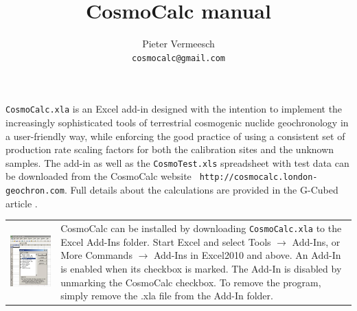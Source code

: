 \documentclass[12pt]{article}
\author{Pieter Vermeesch\\ {\tt cosmocalc@gmail.com}}
\title{CosmoCalc manual}
\date{}
\begin{document}
\maketitle

\begin{minipage}[tbp]{\textwidth}
{\tt CosmoCalc.xla}  is an Excel add-in designed  with the intention
  to  implement the  increasingly sophisticated  tools  of terrestrial
  cosmogenic  nuclide  geochronology  in  a user-friendly  way,  while
  enforcing the good practice of  using a consistent set of production
  rate scaling factors for both  the calibration sites and the unknown
  samples.  The add-in as  well as the {\tt CosmoTest.xls} spreadsheet
  with test  data can  be downloaded from  the CosmoCalc  website {\tt
    http://cosmocalc.london-geochron.com}.    Full   details   about   the
  calculations    are     provided    in    the     G-Cubed    article
  \cite{vermeesch2007}.\\

\begin{tabular}{lp{8cm}}
  \includegraphics[width=.4\textwidth]{checkedAddIn.jpg}
& \vspace{-3.8cm}
  CosmoCalc can be installed by downloading  \texttt{CosmoCalc.xla}  
  to  the  Excel Add-Ins  folder.  Start  Excel and  select
  Tools $\rightarrow$ Add-Ins, or More Commands $\rightarrow$ Add-Ins
in Excel2010 and above. An Add-In is enabled when its checkbox
  is  marked.  The  Add-In  is  disabled by  unmarking  the  CosmoCalc
  checkbox. To remove the program, simply remove the .xla file from the
  Add-In folder.}
\end{tabular}
\end{minipage}
\end{document}
